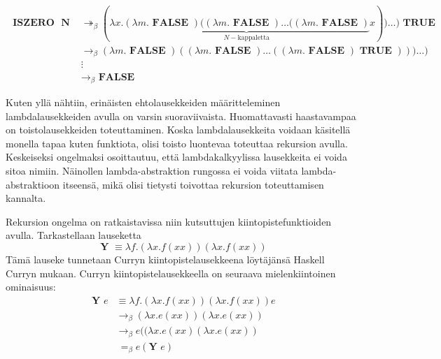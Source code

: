 \begin{align*}
\textbf{ ISZERO } \textbf{ N } &\twoheadrightarrow_{\beta} (\lambda x . \underbrace{ (\lambda m . \textbf{ FALSE }) ( (\lambda m . \textbf{ FALSE }) \ldots ((\lambda m . \textbf{ FALSE }) }_{ N-\text{kappaletta}} x)) \ldots ) \textbf{ TRUE } \\
&\rightarrow_{\beta}  (\lambda m . \textbf{ FALSE }) ( (\lambda m . \textbf{ FALSE }) \ldots ((\lambda m . \textbf{ FALSE }) \textbf{ TRUE }) )) \ldots ) \\
&\vdots \\
&\rightarrow_{\beta} \textbf{ FALSE }
\end{align*}
\par
Kuten yllä nähtiin, erinäisten ehtolausekkeiden määritteleminen lambdalausekkeiden avulla on varsin suoraviivaista. Huomattavasti haastavampaa on toistolausekkeiden toteuttaminen. Koska lambdalausekkeita voidaan käsitellä monella tapaa kuten funktiota, olisi toisto luontevaa toteuttaa rekursion avulla. Keskeiseksi ongelmaksi osoittautuu, että lambdakalkyylissa lausekkeita ei voida sitoa nimiin. Näinollen lambda-abstraktion rungossa ei voida viitata lambda-abstraktioon itseensä, mikä olisi tietysti toivottaa rekursion toteuttamisen kannalta. 
\par 
Rekursion ongelma on ratkaistavissa niin kutsuttujen kiintopistefunktioiden avulla. Tarkastellaan lauseketta 
\[ \textbf{ Y } \equiv \lambda f . (\lambda x . f(xx)) (\lambda x . f(xx)) \]
Tämä lauseke tunnetaan Curryn kiintopistelausekkeena löytäjänsä Haskell Curryn mukaan. Curryn kiintopistelausekkeella on seuraava mielenkiintoinen ominaisuus:
\begin{align*}
\textbf{ Y } e &\equiv \lambda f . (\lambda x . f(xx)) (\lambda x . f(xx)) e \\
&\rightarrow_{\beta} (\lambda x . e(xx)) (\lambda x . e(xx)) \\
&\rightarrow_{\beta} e((\lambda x . e(xx)(\lambda x . e(xx)) \\
&\ =_{\beta} e(\textbf{Y }e) 
\end{align*}




